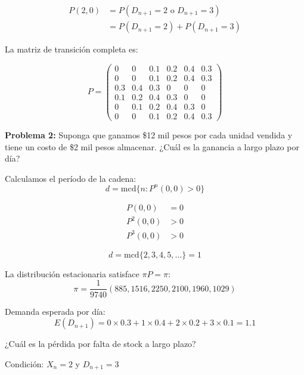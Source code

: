\documentclass[12pt,a4paper]{article}
\begin{document}
\begin{align*}
P(2,0) &= P(D_{n+1}=2 \text{ o } D_{n+1}=3) \\
&= P(D_{n+1}=2) + P(D_{n+1}=3)
\end{align*}

La matriz de transición completa es:

\begin{equation*}
P = \begin{pmatrix}
0 & 0 & 0.1 & 0.2 & 0.4 & 0.3 \\
0 & 0 & 0.1 & 0.2 & 0.4 & 0.3 \\
0.3 & 0.4 & 0.3 & 0 & 0 & 0 \\
0.1 & 0.2 & 0.4 & 0.3 & 0 & 0 \\
0 & 0.1 & 0.2 & 0.4 & 0.3 & 0 \\
0 & 0 & 0.1 & 0.2 & 0.4 & 0.3
\end{pmatrix}
\end{equation*}

\textbf{Problema 2:} Suponga que ganamos \$12 mil pesos por cada unidad vendida y tiene un costo de \$2 mil pesos almacenar. ¿Cuál es la ganancia a largo plazo por día?

Calculamos el período de la cadena:
\begin{equation*}
d = \text{mcd} \{n: P^n(0,0) > 0\}
\end{equation*}

\begin{align*}
P(0,0) &= 0 \\
P^2(0,0) &> 0 \\
P^3(0,0) &> 0
\end{align*}

\begin{equation*}
d = \text{mcd} \{2,3,4,5,\dots\} = 1
\end{equation*}

La distribución estacionaria satisface $\pi P = \pi$:
\begin{equation*}
\pi = \frac{1}{9740} (885, 1516, 2250, 2100, 1960, 1029)
\end{equation*}

Demanda esperada por día:
\begin{equation*}
E(D_{n+1}) = 0 \times 0.3 + 1 \times 0.4 + 2 \times 0.2 + 3 \times 0.1 = 1.1
\end{equation*}

¿Cuál es la pérdida por falta de stock a largo plazo?

Condición: $X_n = 2$ y $D_{n+1} = 3$
\end{document}
